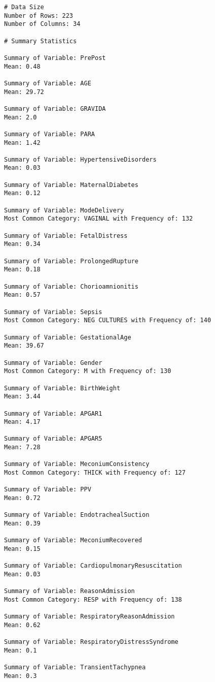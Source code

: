 \documentclass[11pt]{article}
\begin{document}
\begin{Verbatim}[tabsize=4]
# Data Size
Number of Rows: 223
Number of Columns: 34

# Summary Statistics

Summary of Variable: PrePost
Mean: 0.48

Summary of Variable: AGE
Mean: 29.72

Summary of Variable: GRAVIDA
Mean: 2.0

Summary of Variable: PARA
Mean: 1.42

Summary of Variable: HypertensiveDisorders
Mean: 0.03

Summary of Variable: MaternalDiabetes
Mean: 0.12

Summary of Variable: ModeDelivery
Most Common Category: VAGINAL with Frequency of: 132

Summary of Variable: FetalDistress
Mean: 0.34

Summary of Variable: ProlongedRupture
Mean: 0.18

Summary of Variable: Chorioamnionitis
Mean: 0.57

Summary of Variable: Sepsis
Most Common Category: NEG CULTURES with Frequency of: 140

Summary of Variable: GestationalAge
Mean: 39.67

Summary of Variable: Gender
Most Common Category: M with Frequency of: 130

Summary of Variable: BirthWeight
Mean: 3.44

Summary of Variable: APGAR1
Mean: 4.17

Summary of Variable: APGAR5
Mean: 7.28

Summary of Variable: MeconiumConsistency
Most Common Category: THICK with Frequency of: 127

Summary of Variable: PPV
Mean: 0.72

Summary of Variable: EndotrachealSuction
Mean: 0.39

Summary of Variable: MeconiumRecovered
Mean: 0.15

Summary of Variable: CardiopulmonaryResuscitation
Mean: 0.03

Summary of Variable: ReasonAdmission
Most Common Category: RESP with Frequency of: 138

Summary of Variable: RespiratoryReasonAdmission
Mean: 0.62

Summary of Variable: RespiratoryDistressSyndrome
Mean: 0.1

Summary of Variable: TransientTachypnea
Mean: 0.3


\end{Verbatim}
\end{document}
